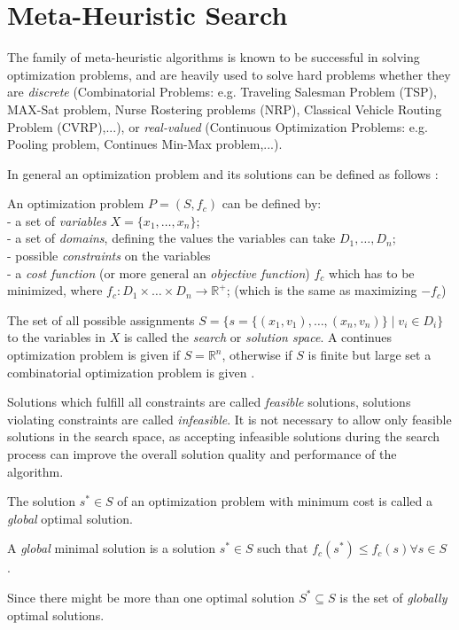 \section{Meta-Heuristic Search}\label{sec:meta}
The family of meta-heuristic algorithms is known to be successful in solving optimization problems, and are heavily used to solve hard problems whether they are  \emph{discrete} (Combinatorial Problems: e.g. Traveling Salesman Problem (TSP), MAX-Sat problem, Nurse Rostering problems (NRP), Classical Vehicle Routing Problem (CVRP),...), or \emph{real-valued} (Continuous Optimization Problems: e.g. Pooling problem, Continues Min-Max problem,...).

In general an optimization problem and its solutions can be defined as follows  \cite{blum2003metaheuristics}: 
\begin{definition}\label{def:problem}
An optimization problem $P = (S, f_c)$ can be defined by:\\
- a set of \emph{variables} $X = \{x_1,\dots,x_n\} $;\\
- a set of \emph{domains}, defining the values the variables can take $D_1,\dots,D_n$;\\
- possible \emph{constraints} on the variables\\
- a \emph{cost function} (or more general an \emph{objective function}) $f_c$ which has to be minimized, where $f_c:D_1 \times \dots \times D_n \rightarrow \mathbb{R}^+$; (which is the same as maximizing $-f_c$)\\
\end{definition}
The set of all possible assignments $S = \{s = \{(x_1,v_1),\dots,(x_n,v_n)\}\mid v_i \in D_i\}$ to the variables in $X$ is called the \emph{search} or \emph{solution space}.
A continues optimization problem is given if $S=\mathbb{R}^n$, otherwise if $S$ is finite but large set a combinatorial optimization problem is given \cite{VNS}. 

Solutions which fulfill all constraints are called \emph{feasible} solutions, solutions violating constraints are called \emph{infeasible}. 
It is not necessary to allow only feasible solutions in the search space, as accepting infeasible solutions during the search process can improve the overall solution quality and performance of the algorithm.

The solution $s^*\in S$ of an optimization problem with minimum cost is called a \emph{global} optimal solution. 
\begin{definition}
 A \emph{global} minimal solution is a solution $s^* \in S$ such that
 $f_c(s^*)\leq f_c(s) \forall s \in S$ \cite{blum2003metaheuristics}. 
\end{definition}
Since there might be more than one optimal solution $S^* \subseteq S$ is the set of \emph{globally} optimal solutions.

